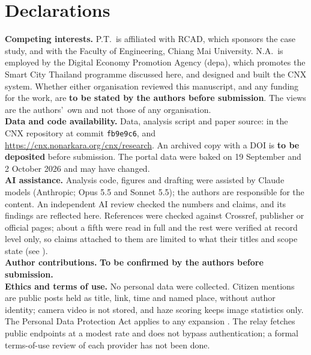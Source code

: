 \documentclass[10pt,twocolumn,a4paper]{article}
\begin{document}
\section*{Declarations}
\small
\textbf{Competing interests.} P.T.\ is affiliated with RCAD, which sponsors the case study, and with the Faculty of Engineering, Chiang Mai University. N.A.\ is employed by the Digital Economy Promotion Agency (depa), which promotes the Smart City Thailand programme discussed here, and designed and built the CNX system. Whether either organisation reviewed this manuscript, and any funding for the work, are \textbf{to be stated by the authors before submission}. The views are the authors\textquoteright\ own and not those of any organisation.\\
\textbf{Data and code availability.} Data, analysis script and paper source:  in the CNX repository at commit \texttt{fb9e9c6}, and \url{https://cnx.nonarkara.org/cnx/research}. An archived copy with a DOI is \textbf{to be deposited} before submission. The portal data were baked on 19 September and 2 October 2026 and may have changed.\\
\textbf{AI assistance.} Analysis code, figures and drafting were assisted by Claude models (Anthropic; Opus 5.5 and Sonnet 5.5); the authors are responsible for the content. An independent AI review checked the numbers and claims, and its findings are reflected here. References were checked against Crossref, publisher or official pages; about a fifth were read in full and the rest were verified at record level only, so claims attached to them are limited to what their titles and scope state (see ).\\
\textbf{Author contributions.} \textbf{To be confirmed by the authors before submission.}\\
\textbf{Ethics and terms of use.} No personal data were collected. Citizen mentions are public posts held as title, link, time and named place, without author identity; camera video is not stored, and haze scoring keeps image statistics only. The Personal Data Protection Act applies to any expansion \citep{thailand2019pdpa}. The relay fetches public endpoints at a modest rate and does not bypass authentication; a formal terms-of-use review of each provider has not been done.

{\small}
\end{document}
